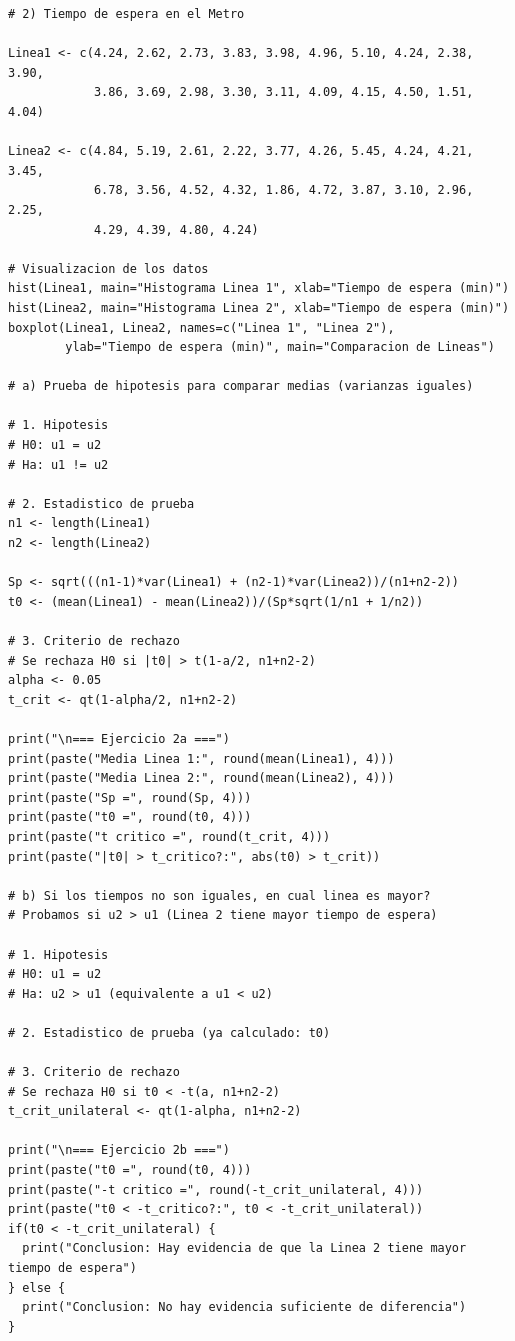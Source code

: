 \documentclass[12pt,a4paper]{article}
\begin{document}
\begin{lstlisting}
# 2) Tiempo de espera en el Metro

Linea1 <- c(4.24, 2.62, 2.73, 3.83, 3.98, 4.96, 5.10, 4.24, 2.38, 3.90, 
            3.86, 3.69, 2.98, 3.30, 3.11, 4.09, 4.15, 4.50, 1.51, 4.04)

Linea2 <- c(4.84, 5.19, 2.61, 2.22, 3.77, 4.26, 5.45, 4.24, 4.21, 3.45, 
            6.78, 3.56, 4.52, 4.32, 1.86, 4.72, 3.87, 3.10, 2.96, 2.25, 
            4.29, 4.39, 4.80, 4.24)

# Visualizacion de los datos
hist(Linea1, main="Histograma Linea 1", xlab="Tiempo de espera (min)")
hist(Linea2, main="Histograma Linea 2", xlab="Tiempo de espera (min)")
boxplot(Linea1, Linea2, names=c("Linea 1", "Linea 2"), 
        ylab="Tiempo de espera (min)", main="Comparacion de Lineas")

# a) Prueba de hipotesis para comparar medias (varianzas iguales)

# 1. Hipotesis
# H0: u1 = u2
# Ha: u1 != u2

# 2. Estadistico de prueba
n1 <- length(Linea1)
n2 <- length(Linea2)

Sp <- sqrt(((n1-1)*var(Linea1) + (n2-1)*var(Linea2))/(n1+n2-2))
t0 <- (mean(Linea1) - mean(Linea2))/(Sp*sqrt(1/n1 + 1/n2))

# 3. Criterio de rechazo
# Se rechaza H0 si |t0| > t(1-a/2, n1+n2-2)
alpha <- 0.05
t_crit <- qt(1-alpha/2, n1+n2-2)

print("\n=== Ejercicio 2a ===")
print(paste("Media Linea 1:", round(mean(Linea1), 4)))
print(paste("Media Linea 2:", round(mean(Linea2), 4)))
print(paste("Sp =", round(Sp, 4)))
print(paste("t0 =", round(t0, 4)))
print(paste("t critico =", round(t_crit, 4)))
print(paste("|t0| > t_critico?:", abs(t0) > t_crit))

# b) Si los tiempos no son iguales, en cual linea es mayor?
# Probamos si u2 > u1 (Linea 2 tiene mayor tiempo de espera)

# 1. Hipotesis
# H0: u1 = u2
# Ha: u2 > u1 (equivalente a u1 < u2)

# 2. Estadistico de prueba (ya calculado: t0)

# 3. Criterio de rechazo
# Se rechaza H0 si t0 < -t(a, n1+n2-2)
t_crit_unilateral <- qt(1-alpha, n1+n2-2)

print("\n=== Ejercicio 2b ===")
print(paste("t0 =", round(t0, 4)))
print(paste("-t critico =", round(-t_crit_unilateral, 4)))
print(paste("t0 < -t_critico?:", t0 < -t_crit_unilateral))
if(t0 < -t_crit_unilateral) {
  print("Conclusion: Hay evidencia de que la Linea 2 tiene mayor tiempo de espera")
} else {
  print("Conclusion: No hay evidencia suficiente de diferencia")
}
\end{lstlisting}
\end{document}
